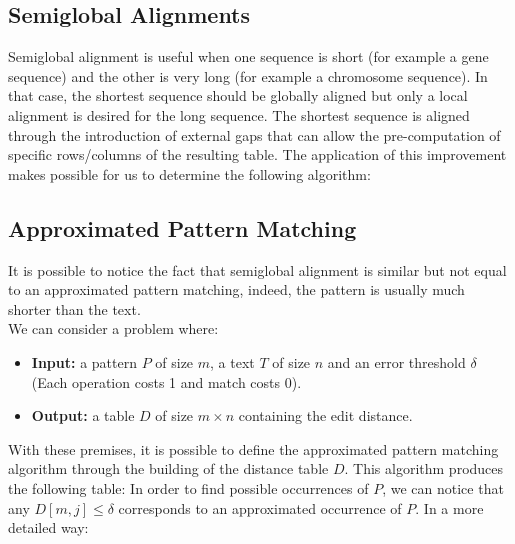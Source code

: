 \subsection{Semiglobal Alignments}
Semiglobal alignment is useful when one sequence is short (for example a gene sequence) and the other is very long (for example a chromosome sequence). In that case, the shortest sequence should be globally aligned but only a local alignment is desired for the long sequence. The shortest sequence is aligned through the introduction of external gaps that can allow the pre-computation of specific rows/columns of the resulting table.
The application of this improvement makes possible for us to determine the following algorithm:

\subsection{Approximated Pattern Matching}
It is possible to notice the fact that semiglobal alignment is similar but not equal to an approximated pattern matching, indeed, the pattern is usually much shorter than the text.\\
We can consider a problem where:
\begin{itemize}
	\item \textbf{Input:} a pattern $P$ of size $m$, a text $T$ of size $n$ and an error threshold $\delta$ (Each operation costs 1 and match costs 0).
	\item \textbf{Output:} a table $D$ of size $m \times n$ containing the edit distance.
\end{itemize}
With these premises, it is possible to define the approximated pattern matching algorithm through the building of the distance table $D$.
This algorithm produces the following table:
In order to find possible occurrences of $P$, we can notice that any $D[m,j] \leq \delta$ corresponds to an approximated occurrence of $P$. In a more detailed way:

